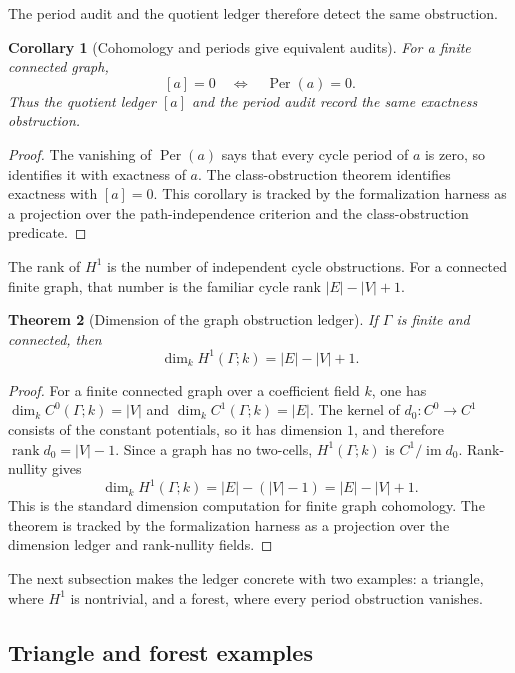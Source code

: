 \documentclass[11pt]{article}
\newcommand{\im}{\operatorname{im}}
\newcommand{\Per}{\operatorname{Per}}
\newtheorem{theorem}{Theorem}[section]
\newtheorem{corollary}[theorem]{Corollary}
\theoremstyle{definition}
\begin{document}
The period audit and the quotient ledger therefore detect the same obstruction.

\begin{corollary}[Cohomology and periods give equivalent audits]
\label{cor:coh-class-period-equivalence}
For a finite connected graph,
\[
[a]=0
\quad\Longleftrightarrow\quad
\Per(a)=0.
\]
Thus the quotient ledger \([a]\) and the period audit record the same exactness obstruction.
\end{corollary}

\begin{proof}
The vanishing of \(\Per(a)\) says that every cycle period of \(a\) is zero, so
 identifies it with exactness of \(a\).  The
class-obstruction theorem identifies exactness with \([a]=0\).  This corollary
is tracked by the formalization harness as a projection over the path-independence
criterion and the class-obstruction predicate.
\end{proof}

The rank of \(H^1\) is the number of independent cycle obstructions.  For a
connected finite graph, that number is the familiar cycle rank \(|E|-|V|+1\).

\begin{theorem}[Dimension of the graph obstruction ledger]
\label{thm:coh-dimension}
If \(\Gamma\) is finite and connected, then
\[
\dim_k H^1(\Gamma;k)=|E|-|V|+1.
\]
\end{theorem}

\begin{proof}
For a finite connected graph over a coefficient field \(k\), one has
\(\dim_k C^0(\Gamma;k)=|V|\) and \(\dim_k C^1(\Gamma;k)=|E|\).  The kernel of
\(d_0:C^0\to C^1\) consists of the constant potentials, so it has dimension
\(1\), and therefore \(\operatorname{rank} d_0=|V|-1\).  Since a graph has no
two-cells, \(H^1(\Gamma;k)\) is \(C^1/\im d_0\).  Rank-nullity gives
\[
\dim_k H^1(\Gamma;k)=|E|-(|V|-1)=|E|-|V|+1.
\]
This is the standard dimension computation for finite graph cohomology.  The
theorem is tracked by the formalization harness as a projection over the
dimension ledger and rank-nullity fields.
\end{proof}

The next subsection makes the ledger concrete with two examples: a triangle,
where \(H^1\) is nontrivial, and a forest, where every period obstruction
vanishes.

\subsection{Triangle and forest examples}
\label{subsec:coh-triangle-forest}
\end{document}
